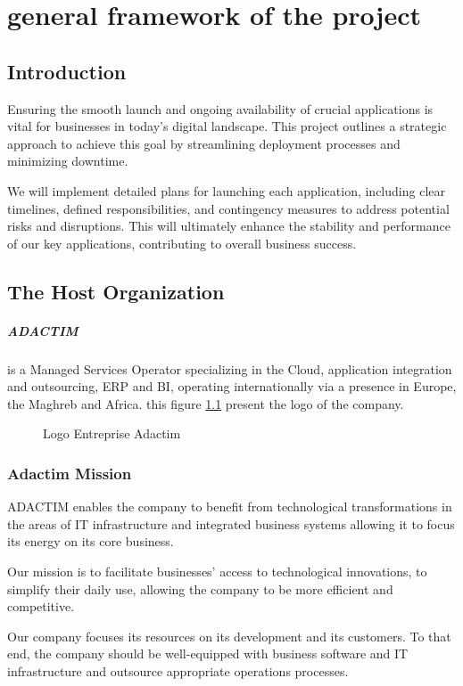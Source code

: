 \chapter{general framework of the project}
\section*{Introduction}
Ensuring the smooth launch and ongoing availability of crucial applications is vital for businesses in today's digital landscape. This project outlines a strategic approach to achieve this goal by streamlining deployment processes and minimizing downtime. 
\par 
We will implement detailed plans for launching each application, including clear timelines, defined responsibilities, and contingency measures to address potential risks and disruptions. This will ultimately enhance the stability and performance of our key applications, contributing to overall business success.
\section{The Host Organization}
\paragraph[short]{ADACTIM}
is a Managed Services Operator specializing in the Cloud, application integration and outsourcing, ERP and BI, operating internationally via a presence in Europe, the Maghreb and Africa.
\newline
this figure \ref{fig:logo_Adactim} present the logo of the company.

\begin{figure}[htpb]
    \centering
    \caption{Logo Entreprise Adactim}
    \label{fig:logo_Adactim}
\end{figure}

\subsection*{Adactim  Mission}
ADACTIM enables the company to benefit from technological transformations in the areas of IT infrastructure and integrated business systems allowing it to focus its energy on its core business.
\par
Our mission is to facilitate businesses' access to technological innovations, to simplify their daily use, allowing the company to be more efficient and competitive.
\par
Our company focuses its resources on its development and its customers. To that end, the company should be well-equipped with business software and IT infrastructure and outsource appropriate operations processes.
